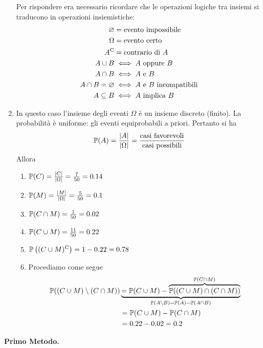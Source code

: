 \begin{enumerate}
	Per rispondere era necessario ricordare che le operazioni logiche tra insiemi si traducono in operazioni insiemistiche:
	\begin{align*}
		\emptyset  & =\text{evento impossibile}\\
		\Omega  & =\text{evento certo}\\
		A\complementary & =\text{contrario di} \ A\\
		A\cup B & \iff A\ \text{oppure} \ B\\
		A\cap B & \iff A\ \text{e} \ B\\
		A\cap B=\emptyset  & \iff A\ \text{e} \ B\ \text{incompatibili}\\
		A\subseteq B & \iff A\ \text{implica} \ B
	\end{align*}
	\item In questo caso l'insieme degli eventi $\Omega $ è un insieme discreto (finito). La probabilità è uniforme: gli eventi equiprobabili a priori. Pertanto si ha
	\begin{equation*}
		\mathbb{P}( A) =\frac{| A| }{| \Omega | } =\frac{\text{casi favorevoli}}{\text{casi possibili}}
	\end{equation*}
	Allora
	\begin{enumerate}
		\item $\mathbb{P}( C) =\frac{| C| }{| \Omega | } =\frac{7}{50} =0.14$
		\item $\mathbb{P}( M) =\frac{| M| }{| \Omega | } =\frac{5}{50} =0.1$
		\item $\mathbb{P}( C\cap M) =\frac{1}{50} =0.02$
		\item $\mathbb{P}( C\cup M) =\frac{11}{50} =0.22$
		\item $\mathbb{P}\left(( C\cup M)^{\mathrm{C}}\right) =1-0.22=0.78$
		\item Procediamo come segue
		\begin{align*}
			\mathbb{P}(( C\cup M) \setminus ( C\cap M)) & \underbrace{=\mathbb{P}( C\cup M) -\overbrace{\mathbb{P}(( C\cup M) \cap ( C\cap M))}^{\mathbb{P}( C\cap M)}}_{\mathbb{P}( A\setminus B) =\mathbb{P}( A) -\mathbb{P}( A\cap B)}\\
			 & =\mathbb{P}( C\cup M) -\mathbb{P}( C\cap M)\\
			 & =0.22-0.02=0.2
		\end{align*}
	\end{enumerate}
\end{enumerate}

\Soluzione

\textbf{Primo Metodo.}

